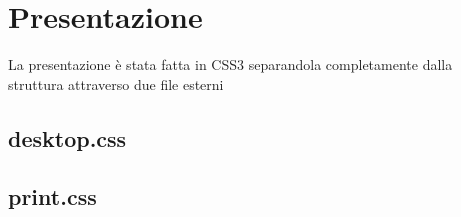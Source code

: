 \section{Presentazione}
	La presentazione è stata fatta in CSS3 separandola completamente dalla struttura attraverso due file esterni 
	\subsection{desktop.css}

	\subsection{print.css}





